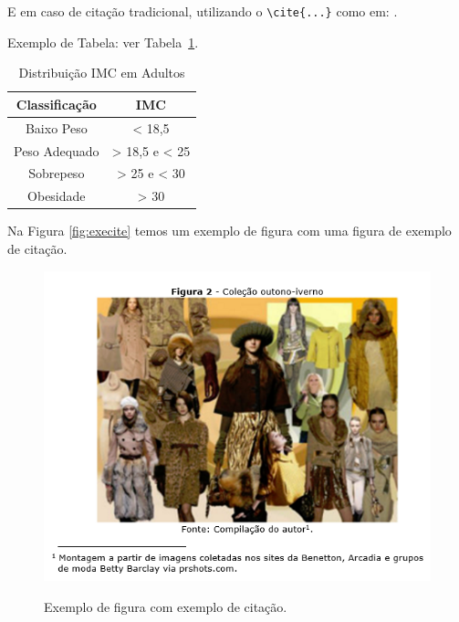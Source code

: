 \documentclass[
    12pt,				       %
    openright,			       %
    oneside,			       %
    a4paper,			       %
    chapter=TITLE,             %
    sumario=tradicional,       %
    english,			        %
    brazil, 				    %
 ]{abntex2}
\begin{document}
E em caso de citação tradicional, utilizando o \verb|\cite{...}| como em:
\cite{NBR14724:2011}.

Exemplo de Tabela: ver Tabela~\ref{tab:exetab}.

\begin{table}[!ht]
    \begin{center}
        \caption{Distribuição IMC em Adultos}
        \label{tab:exetab}
        \begin{tabular}{| c | c |}
            \hline
            \textbf{\textbf{Classificação}} & \textbf{IMC}\\
            \hline\hline
            Baixo Peso & < 18,5 \\
            Peso Adequado & > 18,5 e < 25 \\
            Sobrepeso & > 25 e < 30 \\
            Obesidade & > 30 \\
            \hline
        \end{tabular}
    \end{center}
\end{table}

Na Figura \autoref{fig:execite} temos um exemplo de figura com uma figura de exemplo de citação.

\begin{figure}[!ht]
    \centering
    \caption{Exemplo de figura com exemplo de citação.}
    \includegraphics[width=0.95\linewidth]{figuras/execite.png}
    \label{fig:execite}
\end{figure}
\end{document}
